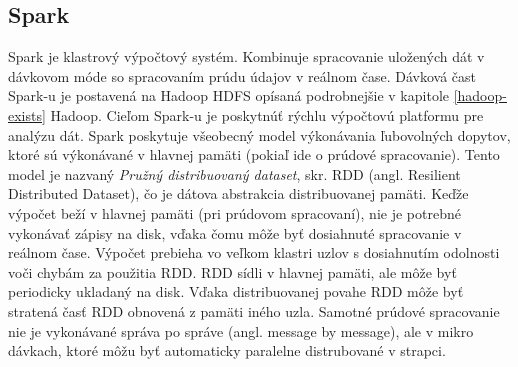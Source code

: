 \subsection{Spark}
Spark \citep{liu2014survey} je klastrový výpočtový systém. Kombinuje spracovanie uložených dát v dávkovom móde so spracovaním prúdu údajov v reálnom čase. Dávková čast Spark-u je postavená na Hadoop HDFS opísaná podrobnejšie v kapitole \ref{hadoop-exists} Hadoop.
Cieľom Spark-u je poskytnúť rýchlu výpočtovú platformu pre analýzu dát. Spark poskytuje všeobecný model výkonávania ľubovolných dopytov, ktoré sú výkonávané v hlavnej pamäti (pokiaľ ide o prúdové spracovanie). Tento model je nazvaný \textit{Pružný distribuovaný dataset}, skr. RDD (angl. Resilient Distributed Dataset), čo je dátova abstrakcia distribuovanej pamäti. Keďže výpočet beží v hlavnej pamäti (pri prúdovom spracovaní), nie je potrebné vykonávať zápisy na disk, vďaka čomu môže byť dosiahnuté spracovanie v reálnom čase. Výpočet prebieha vo veľkom klastri uzlov s dosiahnutím odolnosti voči chybám za použitia RDD. RDD  sídli v hlavnej pamäti, ale môže byť periodicky ukladaný na disk. Vďaka distribuovanej povahe RDD môže byť stratená časť RDD obnovená z pamäti iného uzla. Samotné prúdové spracovanie nie je vykonávané správa po správe (angl. message by message), ale v mikro dávkach, ktoré môžu byť automaticky paralelne distrubované v strapci.


